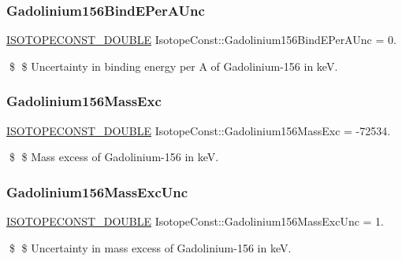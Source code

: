 \subsubsection{\texorpdfstring{Gadolinium156\+Bind\+E\+Per\+A\+Unc}{Gadolinium156BindEPerAUnc}}
{\footnotesize\ttfamily \mbox{\hyperlink{group___isotope_const-_macros_ga8f45a7272ce02c0b4c65c44636ed719a}{I\+S\+O\+T\+O\+P\+E\+C\+O\+N\+S\+T\+\_\+\+D\+O\+U\+B\+LE}} Isotope\+Const\+::\+Gadolinium156\+Bind\+E\+Per\+A\+Unc = 0.}

\$ \$ Uncertainty in binding energy per A of Gadolinium-\/156 in keV. \mbox{\label{group___isotope_const-_gadolinium-_gd156_gaa5c715b8de4c998b885557512fcf649b}} 
\subsubsection{\texorpdfstring{Gadolinium156\+Mass\+Exc}{Gadolinium156MassExc}}
{\footnotesize\ttfamily \mbox{\hyperlink{group___isotope_const-_macros_ga8f45a7272ce02c0b4c65c44636ed719a}{I\+S\+O\+T\+O\+P\+E\+C\+O\+N\+S\+T\+\_\+\+D\+O\+U\+B\+LE}} Isotope\+Const\+::\+Gadolinium156\+Mass\+Exc = -\/72534.}

\$ \$ Mass excess of Gadolinium-\/156 in keV. \mbox{\label{group___isotope_const-_gadolinium-_gd156_gae2d2e5412904ae57a8d8f6064f405bcd}} 
\subsubsection{\texorpdfstring{Gadolinium156\+Mass\+Exc\+Unc}{Gadolinium156MassExcUnc}}
{\footnotesize\ttfamily \mbox{\hyperlink{group___isotope_const-_macros_ga8f45a7272ce02c0b4c65c44636ed719a}{I\+S\+O\+T\+O\+P\+E\+C\+O\+N\+S\+T\+\_\+\+D\+O\+U\+B\+LE}} Isotope\+Const\+::\+Gadolinium156\+Mass\+Exc\+Unc = 1.}

\$ \$ Uncertainty in mass excess of Gadolinium-\/156 in keV. \mbox{\label{group___isotope_const-_gadolinium-_gd156_gad84a2e04e95572411e2cef07592ddd80}} 
